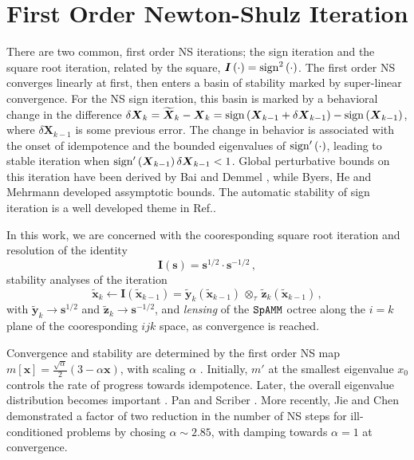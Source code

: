 \documentclass[letterpaper,twocolumn,amsmath,amsfont,amssymb,english,aps,jcp,preprintnumbers,groupaddress,nofootinbib,tightenlines]{revtex4}
\newcommand{\mat}[1]{\boldsymbol{#1}}
\newcommand{\ot}{ {\scriptstyle \otimes}_{ \tau } }
\begin{document}
\section{First Order Newton-Shulz Iteration}

There are two common, first order NS iterations; the sign iteration and the square root iteration, related by the square, $\mat{I}\left( \cdot \right)= {\rm sign}^2\left( \cdot \right) $.  The first order NS converges linearly at first, then enters a basin of stability marked by super-linear convergence.   
For the NS sign iteration, this basin is marked by a behavioral change in the
difference $\delta \mat{X}_k = \widetilde{\mat{X}}_k -\mat{X}_k = {\rm sign} \left(\mat{X}_{k-1}+\delta \mat{X}_{k-1} \right)
-{\rm sign} \left(\mat{X}_{k-1} \right)$, where $\delta \mat{X}_{k-1}$ is some previous error.
The change in behavior is associated with the onset of idempotence and the bounded eigenvalues of ${\rm sign}'\left( \cdot \right)$, leading to stable 
iteration when ${\rm sign}'\left( \mat{X}_{k-1} \right) \delta \mat{X}_{k-1} < 1 $.  
Global perturbative bounds on this iteration have been derived by Bai and Demmel \cite{Bai98usingthe}, while
Byers, He and Mehrmann \cite{} developed assymptotic bounds.  
The automatic stability of sign iteration is a well developed theme in Ref.\cite{Higham08}.

In this work, we are concerned with the cooresponding square root iteration and resolution of the identity \cite{}
\begin{equation}
\mat{I} \left( \mat{s} \right) =\mat{s}^{1/2} \cdot \mat{s}^{-1/2} \, ,
\end{equation}
stability analyses of the iteration 
\begin{equation}
\widetilde{\mat{x}}_k \leftarrow \mat{I} \left( \widetilde{\mat{x}}_{k-1} \right) = \widetilde{\mat{y}}_k \left( \widetilde{\mat{x}}_{k-1} \right)
\, \ot \, \widetilde{\mat{z}}_k \left( \widetilde{\mat{x}}_{k-1} \right) \, ,
\end{equation}
with  $\widetilde{\mat{y}}_k \rightarrow \mat{s}^{1/2}$ and $\widetilde{\mat{z}}_k \rightarrow \mat{s}^{-1/2}$, and  
{\em lensing} of the $\tt SpAMM$ octree along the $i=k$ plane of the cooresponding $ijk$ space, as convergence is reached. 


Convergence and stability are determined by the first order NS map $m[\mat{x}]=\frac{\sqrt{\alpha}}{2} \left(3-\alpha \mat{x} \right)$, 
with scaling $\alpha$ \cite{}. 
Initially, $m'$ at the smallest eigenvalue $x_0$ controls the rate of progress towards idempotence.  
Later, the overall eigenvalue distribution becomes important \cite{}. Pan and Scriber .  More recently, 
Jie and Chen demonstrated a factor of two reduction 
in the number of NS steps for ill-conditioned problems by chosing $\alpha \sim 2.85$, with damping towards $\alpha=1$ at 
convergence.  
\end{document}
